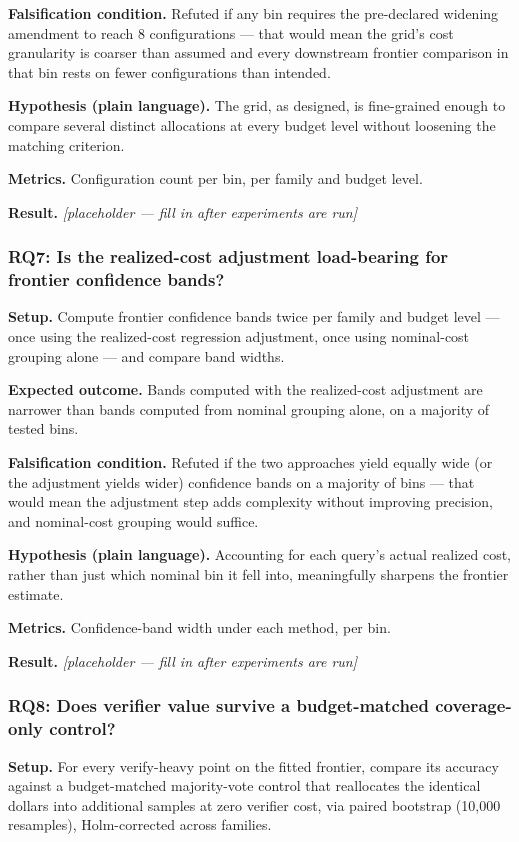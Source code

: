 \documentclass[11pt]{article}
\newcommand{\ph}{\textit{[placeholder --- fill in after experiments are run]}}
\begin{document}
\textbf{Falsification condition.} Refuted if any bin requires the pre-declared widening amendment to reach 8 configurations --- that would mean the grid's cost granularity is coarser than assumed and every downstream frontier comparison in that bin rests on fewer configurations than intended.

\textbf{Hypothesis (plain language).} The grid, as designed, is fine-grained enough to compare several distinct allocations at every budget level without loosening the matching criterion.

\textbf{Metrics.} Configuration count per bin, per family and budget level.

\textbf{Result.} \ph

\subsubsection{RQ7: Is the realized-cost adjustment load-bearing for frontier confidence bands?}
\textbf{Setup.} Compute frontier confidence bands twice per family and budget level --- once using the realized-cost regression adjustment, once using nominal-cost grouping alone --- and compare band widths.

\textbf{Expected outcome.} Bands computed with the realized-cost adjustment are narrower than bands computed from nominal grouping alone, on a majority of tested bins.

\textbf{Falsification condition.} Refuted if the two approaches yield equally wide (or the adjustment yields wider) confidence bands on a majority of bins --- that would mean the adjustment step adds complexity without improving precision, and nominal-cost grouping would suffice.

\textbf{Hypothesis (plain language).} Accounting for each query's actual realized cost, rather than just which nominal bin it fell into, meaningfully sharpens the frontier estimate.

\textbf{Metrics.} Confidence-band width under each method, per bin.

\textbf{Result.} \ph

\subsubsection{RQ8: Does verifier value survive a budget-matched coverage-only control?}
\textbf{Setup.} For every verify-heavy point on the fitted frontier, compare its accuracy against a budget-matched majority-vote control that reallocates the identical dollars into additional samples at zero verifier cost, via paired bootstrap (10,000 resamples), Holm-corrected across families.
\end{document}
